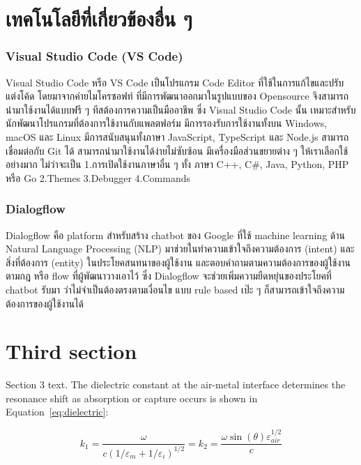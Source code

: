 \section{เทคโนโลยีที่เกี่ยวข้องอื่น ๆ}

\subsubsection{Visual Studio Code (VS Code)}
\quad Visual Studio Code หรือ VS Code เป็นโปรแกรม Code Editor ที่ใช้ในการแก้ไขและปรับแต่งโค้ด โดยมาจากค่ายไมโครซอฟท์ ที่มีการพัฒนาออกมาในรูปแบบของ Opensource จึงสามารถนำมาใช้งานได้แบบฟรี ๆ ทีสต้องการความเป็นมืออาชีพ ซึ่ง Visual Studio Code นั้น เหมาะสำหรับนักพัฒนาโปรแกรมที่ต้องการใช้งานกับแพลตฟอร์ม มีการรองรับการใช้งานทั้งบน Windows, macOS และ Linux มีการสนับสนุนทั้งภาษา  JavaScript, TypeScript และ Node.js สามารถเชื่อมต่อกับ  Git ได้ สามารถนำมาใช้งานได้ง่ายไม่ซับซ้อน มีเครื่องมือส่วนขยายต่าง ๆ ให้เราเลือกใช้อย่างมาก ไม่ว่าจะเป็น 1.การเปิดใช้งานภาษาอื่น ๆ ทั้ง ภาษา  C++,  C\#, Java, Python, PHP หรือ Go  2.Themes 3.Debugger 4.Commands 

\subsubsection{Dialogflow} 

\quad Dialogflow คือ platform สำหรับสร้าง chatbot ของ Google ที่ใช้ machine learning ด้าน Natural Language Processing (NLP) มาช่วยในทำความเข้าใจถึงความต้องการ (intent) และสิ่งที่ต้องการ (entity) ในประโยคสนทนาของผู้ใช้งาน และตอบคำถามตามความต้องการของผู้ใช้งาน ตามกฎ หรือ flow ที่ผู้พัฒนาวางเอาไว้ ซึ่ง Dialogflow จะช่วยเพิ่มความยืดหยุ่นของประโยคที่ chatbot รับมา ว่าไม่จำเป็นต้องตรงตามเงื่อนไข แบบ rule based เป๊ะ ๆ ก็สามารถเข้าใจถึงความต้องการของผู้ใช้งานได้ 

\section{Third section}
Section 3 text. The dielectric constant
at the air-metal interface determines
the resonance shift as absorption or capture occurs
is shown in Equation~\eqref{eq:dielectric}:

\begin{equation}\label{eq:dielectric}
k_1=\frac{\omega}{c({1/\varepsilon_m + 1/\varepsilon_i})^{1/2}}=k_2=\frac{\omega
\sin(\theta)\varepsilon_\mathit{air}^{1/2}}{c}
\end{equation}

